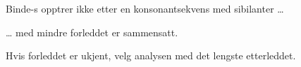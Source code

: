 \begin{enum}
		\newline
	
	\item Binde-s opptrer ikke etter en konsonantsekvens med sibilanter … 
		
		\newline
	
	\item … med mindre forleddet er sammensatt.
		
		\newline
	
	\item Hvis forleddet er ukjent, velg analysen med det lengste etterleddet.
		
		\newline
	
\end{enum}


